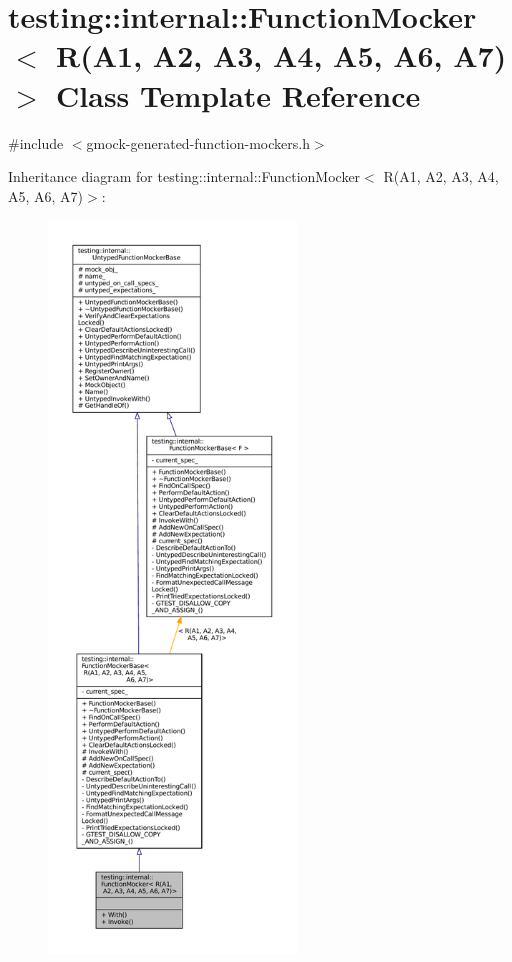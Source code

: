 \hypertarget{classtesting_1_1internal_1_1FunctionMocker_3_01R_07A1_00_01A2_00_01A3_00_01A4_00_01A5_00_01A6_00_01A7_08_4}{}\section{testing\+:\+:internal\+:\+:Function\+Mocker$<$ R(A1, A2, A3, A4, A5, A6, A7)$>$ Class Template Reference}
\label{classtesting_1_1internal_1_1FunctionMocker_3_01R_07A1_00_01A2_00_01A3_00_01A4_00_01A5_00_01A6_00_01A7_08_4}


{\ttfamily \#include $<$gmock-\/generated-\/function-\/mockers.\+h$>$}



Inheritance diagram for testing\+:\+:internal\+:\+:Function\+Mocker$<$ R(A1, A2, A3, A4, A5, A6, A7)$>$\+:
\nopagebreak
\begin{figure}[H]
\begin{center}
\leavevmode
\includegraphics[height=550pt]{classtesting_1_1internal_1_1FunctionMocker_3_01R_07A1_00_01A2_00_01A3_00_01A4_00_01A5_00_01A6_00_01A7_08_4__inherit__graph}
\end{center}
\end{figure}


